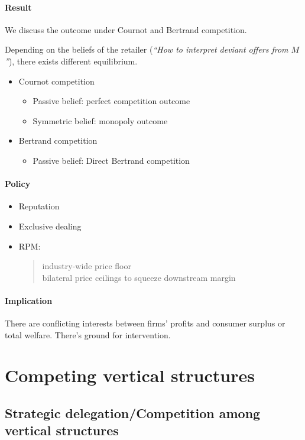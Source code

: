 \paragraph{Result} We discuss the outcome under Cournot and Bertrand competition.
\begin{remark}
    Depending on the beliefs of the retailer (\textit{``How to interpret deviant offers from $M$''}), there exists different equilibrium.
\end{remark}
\begin{itemize}
    \item Cournot competition
    \begin{itemize}
        \item Passive belief: perfect competition outcome
        \item Symmetric belief: monopoly outcome
    \end{itemize}
    \item Bertrand competition
    \begin{itemize}
        \item Passive belief: Direct Bertrand competition
    \end{itemize}
\end{itemize}
\paragraph{Policy}
\begin{itemize}
    \item Reputation
    \item Exclusive dealing
    \item RPM: 
        \begin{quote}
            industry-wide price floor\\
            bilateral price ceilings to squeeze downstream margin
        \end{quote}
\end{itemize}

\paragraph{Implication}
There are conflicting interests between firms’ profits and consumer surplus or total welfare. There's ground for intervention.
\section{Competing vertical structures}
\subsection{Strategic delegation/Competition among vertical structures}
